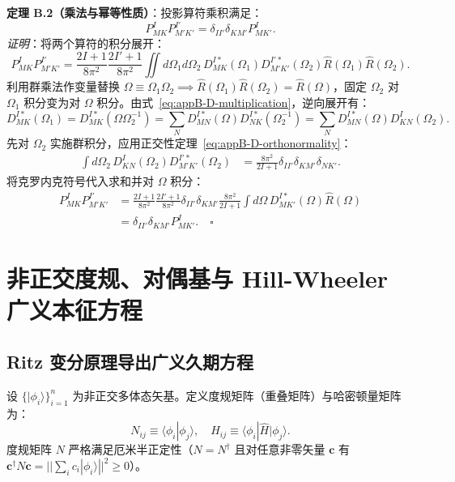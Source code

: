 \textbf{定理 B.2（乘法与幂等性质）}：投影算符乘积满足：
\begin{equation}\label{eq:appB-proj-product}
P^I_{MK} P^{I'}_{M'K'} = \delta_{II'} \delta_{KM'} P^I_{MK'}.
\end{equation}
\textit{证明}：将两个算符的积分展开：
\begin{equation}
P^I_{MK} P^{I'}_{M'K'} = \frac{2I+1}{8\pi^2} \frac{2I'+1}{8\pi^2} \iint d\Omega_1 d\Omega_2 \, D^{I*}_{MK}(\Omega_1) D^{I'*}_{M'K'}(\Omega_2) \hat{R}(\Omega_1) \hat{R}(\Omega_2).
\end{equation}
利用群乘法作变量替换 $\Omega \equiv \Omega_1 \Omega_2 \implies \hat{R}(\Omega_1) \hat{R}(\Omega_2) = \hat{R}(\Omega)$，固定 $\Omega_2$ 对 $\Omega_1$ 积分变为对 $\Omega$ 积分。由式~\eqref{eq:appB-D-multiplication}，逆向展开有：
\begin{equation}
D^{I*}_{MK}(\Omega_1) = D^{I*}_{MK}(\Omega \Omega_2^{-1}) = \sum_N D^{I*}_{MN}(\Omega) D^{I*}_{NK}(\Omega_2^{-1}) = \sum_N D^{I*}_{MN}(\Omega) D^I_{KN}(\Omega_2).
\end{equation}
先对 $\Omega_2$ 实施群积分，应用正交性定理~\eqref{eq:appB-D-orthonormality}：
\begin{align}
\int d\Omega_2 \, D^I_{KN}(\Omega_2) D^{I'*}_{M'K'}(\Omega_2) &= \frac{8\pi^2}{2I+1} \delta_{II'} \delta_{KM'} \delta_{NK'}.
\end{align}
将克罗内克符号代入求和并对 $\Omega$ 积分：
\begin{align}
P^I_{MK} P^{I'}_{M'K'} &= \frac{2I+1}{8\pi^2} \frac{2I'+1}{8\pi^2} \delta_{II'} \delta_{KM'} \frac{8\pi^2}{2I+1} \int d\Omega \, D^{I*}_{MK'}(\Omega) \hat{R}(\Omega) \nonumber \\
&= \delta_{II'} \delta_{KM'} P^I_{MK'}. \quad \square
\end{align}

\section{非正交度规、对偶基与 Hill-Wheeler 广义本征方程}\label{sec:appB-2}

\subsection{Ritz 变分原理导出广义久期方程}

设 $\{ |\phi_i\rangle \}_{i=1}^n$ 为非正交多体态矢基。定义度规矩阵（重叠矩阵）与哈密顿量矩阵为：
\begin{equation}\label{eq:appB-metric-def}
N_{ij} \equiv \langle \phi_i | \phi_j \rangle, \quad H_{ij} \equiv \langle \phi_i | \hat{H} | \phi_j \rangle.
\end{equation}
度规矩阵 $N$ 严格满足厄米半正定性（$N = N^\dagger$ 且对任意非零矢量 $\mathbf{c}$ 有 $\mathbf{c}^\dagger N \mathbf{c} = || \sum_i c_i |\phi_i\rangle ||^2 \ge 0$）。

